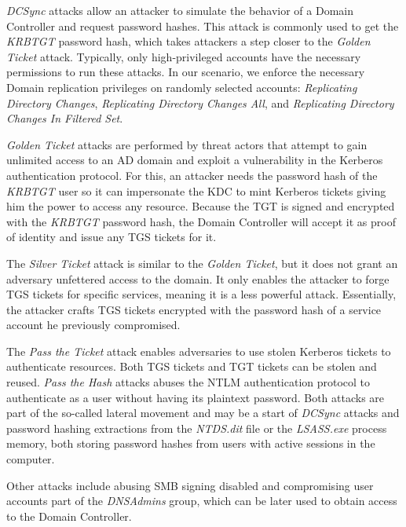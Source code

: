 \textit{DCSync} attacks allow an attacker to simulate the behavior of a Domain Controller and request password hashes. This attack is commonly used to get the \textit{KRBTGT} password hash, which takes attackers a step closer to the \textit{Golden Ticket} attack. Typically, only high-privileged accounts have the necessary permissions to run these attacks. In our scenario, we enforce the necessary Domain replication privileges on randomly selected accounts: \textit{Replicating Directory Changes}, \textit{Replicating Directory Changes All}, and \textit{Replicating Directory Changes In Filtered Set}.

\textit{Golden Ticket} attacks are performed by threat actors that attempt to gain unlimited access to an AD domain and exploit a vulnerability in the Kerberos authentication protocol. For this, an attacker needs the password hash of the \textit{KRBTGT} user so it can impersonate the KDC to mint Kerberos tickets giving him the power to access any resource. Because the TGT is signed and encrypted with the \textit{KRBTGT} password hash, the Domain Controller will accept it as proof of identity and issue any TGS tickets for it.


The \textit{Silver Ticket} attack is similar to the \textit{Golden Ticket}, but it does not grant an adversary unfettered access to the domain. It only enables the attacker to forge TGS tickets for specific services, meaning it is a less powerful attack. Essentially, the attacker crafts TGS tickets encrypted with the password hash of a service account he previously compromised.

The \textit{Pass the Ticket} attack enables adversaries to use stolen Kerberos tickets to authenticate resources. Both TGS tickets and TGT tickets can be stolen and reused. \textit{Pass the Hash} attacks abuses the NTLM authentication protocol to authenticate as a user without having its plaintext password. Both attacks are part of the so-called lateral movement and may be a start of \textit{DCSync} attacks and password hashing extractions from the \textit{NTDS.dit} file or the \textit{LSASS.exe} process memory, both storing password hashes from users with active sessions in the computer.

Other attacks include abusing SMB signing disabled and compromising user accounts part of the \textit{DNSAdmins} group, which can be later used to obtain access to the Domain Controller.


